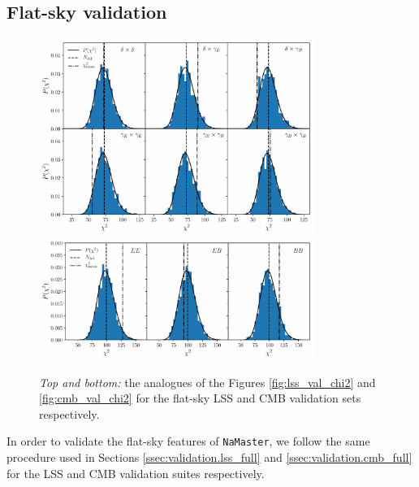 \documentclass[usenatbib]{mnrasb}
\newcommand{\nmt}{{\tt NaMaster}}
\begin{document}
    \subsection{Flat-sky validation}\label{ssec:validation.flat}
      \begin{figure}
        \centering
        \includegraphics[width=0.80\textwidth]{val_chi2_lss_flat}
        \includegraphics[width=0.80\textwidth]{val_chi2_cmb_flat}
        \caption{{\sl Top and bottom:} the analogues of the Figures \ref{fig:lss_val_chi2} and \ref{fig:cmb_val_chi2} for the flat-sky LSS and CMB validation sets respectively.} \label{fig:val_chi2_flat}
      \end{figure}
      
      In order to validate the flat-sky features of \nmt, we follow the same procedure used in Sections \ref{ssec:validation.lss_full} and \ref{ssec:validation.cmb_full} for the LSS and CMB validation suites respectively.
      
\end{document}
